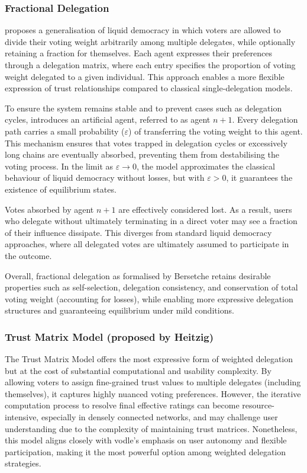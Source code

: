 \subsubsection*{Fractional Delegation~\citep{bersetche2024}}

\citeauthor{bersetche2024} proposes a generalisation of liquid democracy in which voters are allowed to divide their voting weight arbitrarily among multiple delegates, while optionally retaining a fraction for themselves. Each agent expresses their preferences through a delegation matrix, where each entry specifies the proportion of voting weight delegated to a given individual. This approach enables a more flexible expression of trust relationships compared to classical single-delegation models.

To ensure the system remains stable and to prevent cases such as delegation cycles, \citeauthor{bersetche2024} introduces an artificial agent, referred to as agent \(n+1\). Every delegation path carries a small probability (\(\varepsilon\)) of transferring the voting weight to this agent. This mechanism ensures that votes trapped in delegation cycles or excessively long chains are eventually absorbed, preventing them from destabilising the voting process. In the limit as \(\varepsilon \to 0\), the model approximates the classical behaviour of liquid democracy without losses, but with \(\varepsilon > 0\), it guarantees the existence of equilibrium states.

Votes absorbed by agent \(n+1\) are effectively considered lost. As a result, users who delegate without ultimately terminating in a direct voter may see a fraction of their influence dissipate. This diverges from standard liquid democracy approaches, where all delegated votes are ultimately assumed to participate in the outcome.

Overall, fractional delegation as formalised by Bersetche retains desirable properties such as self-selection, delegation consistency, and conservation of total voting weight (accounting for losses), while enabling more expressive delegation structures and guaranteeing equilibrium under mild conditions.


\subsubsection*{Trust Matrix Model (proposed by Heitzig)}

The Trust Matrix Model offers the most expressive form of weighted delegation but at the cost of substantial computational and usability complexity. By allowing voters to assign fine-grained trust values to multiple delegates (including themselves), it captures highly nuanced voting preferences. However, the iterative computation process to resolve final effective ratings can become resource-intensive, especially in densely connected networks, and may challenge user understanding due to the complexity of maintaining trust matrices. Nonetheless, this model aligns closely with vodle's emphasis on user autonomy and flexible participation, making it the most powerful option among weighted delegation strategies.

